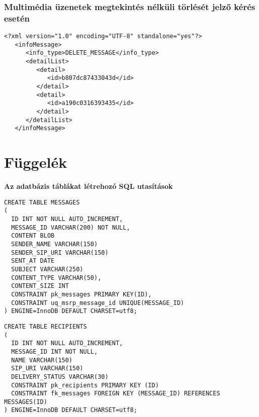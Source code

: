 \subsubsection*{Multimédia üzenetek megtekintés nélküli törlését jelző kérés esetén}
\fontsize{10}{10}
\begin{verbatim}
<?xml version="1.0" encoding="UTF-8" standalone="yes"?>
   <infoMessage>
      <info_type>DELETE_MESSAGE</info_type>
      <detailList>
         <detail>
            <id>b807dc87433043d</id>
         </detail>
         <detail>
            <id>a190c0316393435</id>
         </detail>
      </detailList>
   </infoMessage>
\end{verbatim}
\fontsize{12}{12} 
\newpage 

\section{Függelék}
\label{sec:sql_utasitasok_fuggelek}

\noindent
{\bf Az adatbázis táblákat létrehozó SQL utasítások}

\fontsize{10}{10}
\begin{verbatim}
CREATE TABLE MESSAGES
(
  ID INT NOT NULL AUTO_INCREMENT,
  MESSAGE_ID VARCHAR(200) NOT NULL,
  CONTENT BLOB
  SENDER_NAME VARCHAR(150)
  SENDER_SIP_URI VARCHAR(150)
  SENT_AT DATE
  SUBJECT VARCHAR(250)
  CONTENT_TYPE VARCHAR(50),
  CONTENT_SIZE INT
  CONSTRAINT pk_messages PRIMARY KEY(ID),
  CONSTRAINT uq_msrp_message_id UNIQUE(MESSAGE_ID)
) ENGINE=InnoDB DEFAULT CHARSET=utf8;
\end{verbatim}
\fontsize{12}{12}

\fontsize{10}{10}
\begin{verbatim}
CREATE TABLE RECIPIENTS
(
  ID INT NOT NULL AUTO_INCREMENT,
  MESSAGE_ID INT NOT NULL,
  NAME VARCHAR(150)
  SIP_URI VARCHAR(150)
  DELIVERY_STATUS VARCHAR(30)
  CONSTRAINT pk_recipients PRIMARY KEY (ID)
  CONSTRAINT fk_messages FOREIGN KEY (MESSAGE_ID) REFERENCES MESSAGES(ID)
) ENGINE=InnoDB DEFAULT CHARSET=utf8;
\end{verbatim}
\fontsize{12}{12}


